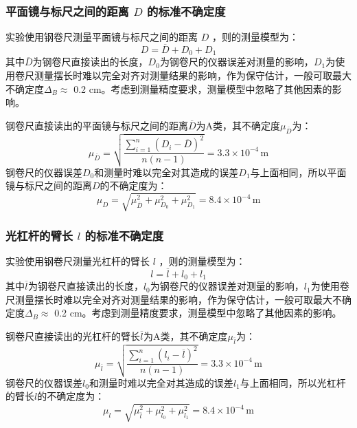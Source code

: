 \documentclass[a4paper]{extarticle}
\begin{document}
    \subsubsection{平面镜与标尺之间的距离 $D$ 的标准不确定度}
    \hspace{2em}
    实验使用钢卷尺测量平面镜与标尺之间的距离 $D$ ，则的测量模型为：
    \begin{equation*}
        D=\overline{D}+D_0+D_1
    \end{equation*}
    其中$\overline{D}$为钢卷尺直接读出的长度，$D_0$为钢卷尺的仪器误差对测量的影响，$D_1$为使用卷尺测量摆长时难以完全对齐对测量结果的影响，作为保守估计，一般可取最大不确定度$\Delta_B\approx$ 0.2 cm。考虑到测量精度要求，测量模型中忽略了其他因素的影响。
    \par\hspace{2em}
    钢卷尺直接读出的平面镜与标尺之间的距离$\overline{D}$为A类，其不确定度$\mu_{\overline{D}}$为：
    \begin{equation*}
        \mu_{\overline{D}}=\sqrt{\frac{\sum\limits_{i=1}^{n}(D_i-\overline{D})^2}{n(n-1)}}=3.3\times10^{-4}\,\text{m}
    \end{equation*}
    \hspace{2em}
    钢卷尺的仪器误差$D_0$和测量时难以完全对其造成的误差$D_1$与上面相同，所以平面镜与标尺之间的距离$D$的不确定度为：
    \begin{equation*}
        \mu_D=\sqrt{\mu_{\overline{D}}^2+\mu_{D_0}^2+\mu_{D_1}^2}=8.4\times10^{-4}\,\text{m}
    \end{equation*}
    \subsubsection{光杠杆的臂长 $l$ 的标准不确定度}
    \hspace{2em}
    实验使用钢卷尺测量光杠杆的臂长 $l$ ，则的测量模型为：
    \begin{equation*}
        l=\overline{l}+l_0+l_1
    \end{equation*}
    其中$\overline{l}$为钢卷尺直接读出的长度，$l_0$为钢卷尺的仪器误差对测量的影响，$l_1$为使用卷尺测量摆长时难以完全对齐对测量结果的影响，作为保守估计，一般可取最大不确定度$\Delta_B\approx$ 0.2 cm。考虑到测量精度要求，测量模型中忽略了其他因素的影响。
    \par\hspace{2em}
    钢卷尺直接读出的光杠杆的臂长$\overline{l}$为A类，其不确定度$\mu_{\overline{l}}$为：
    \begin{equation*}
        \mu_{\overline{l}}=\sqrt{\frac{\sum\limits_{i=1}^{n}(l_i-\overline{l})^2}{n(n-1)}}=3.3\times10^{-4}\,\text{m}
    \end{equation*}
    \hspace{2em}
    钢卷尺的仪器误差$l_0$和测量时难以完全对其造成的误差$l_1$与上面相同，所以光杠杆的臂长$l$的不确定度为：
    \begin{equation*}
        \mu_l=\sqrt{\mu_{\overline{l}}^2+\mu_{l_0}^2+\mu_{l_1}^2}=8.4\times10^{-4}\,\text{m}
    \end{equation*}
\end{document}
